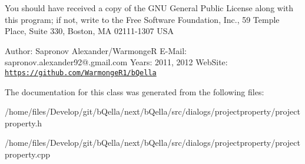 You should have received a copy of the GNU General Public License along with this program; if not, write to the Free Software Foundation, Inc., 59 Temple Place, Suite 330, Boston, MA 02111-\/1307 USA

Author: Sapronov Alexander/WarmongeR E-\/Mail: sapronov.alexander92@.gmail.com Years: 2011, 2012 WebSite: \href{https://github.com/WarmongeR1/bQella}{\tt https://github.com/WarmongeR1/bQella} 

The documentation for this class was generated from the following files:\begin{DoxyCompactItemize}
\item 
/home/files/Develop/git/bQella/next/bQella/src/dialogs/projectproperty/projectproperty.h\item 
/home/files/Develop/git/bQella/next/bQella/src/dialogs/projectproperty/projectproperty.cpp\end{DoxyCompactItemize}

